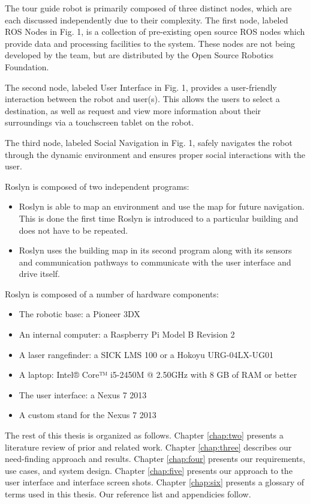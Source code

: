 \documentclass[11pt]{report}
\begin{document}
The tour guide robot is primarily composed of three distinct nodes, which are each discussed independently due to their complexity. The first node, labeled ROS Nodes in Fig. 1, is a collection of pre-existing open source ROS nodes which provide data and processing facilities to the system. These nodes are not being developed by the team, but are distributed by the Open Source Robotics Foundation.

The second node, labeled User Interface in Fig. 1, provides a user-friendly interaction between the robot and user(s). This allows the users to select a destination, as well as request and view more information about their surroundings via a touchscreen tablet on the robot.

The third node, labeled Social Navigation in Fig. 1, safely navigates the robot through the dynamic environment and ensures proper social interactions with the user.

Roslyn is composed of two independent programs:
\begin{itemize}
 \item Roslyn is able to map an environment and use the map for future navigation. This is done the first time Roslyn is introduced to a particular building and does not have to be repeated.
 \item Roslyn uses the building map in its second program along with its sensors and communication pathways to communicate with the user interface and drive itself.
\end{itemize}


Roslyn is composed of a number of hardware components:
\begin{itemize}
 \item The robotic base: a Pioneer 3DX
 \item An internal computer: a Raspberry Pi Model B Revision 2
 \item A laser rangefinder: a SICK LMS 100 or a Hokoyu URG-04LX-UG01
 \item A laptop: Intel® Core™ i5-2450M @ 2.50GHz with 8 GB of RAM or better
 \item The user interface: a Nexus 7 2013
 \item A custom stand for the Nexus 7 2013
\end{itemize}

The rest of this thesis is organized as follows. Chapter \ref{chap:two} presents a literature review of prior and related work. Chapter \ref{chap:three} describes our need-finding approach and results. Chapter \ref{chap:four} presents our requirements, use cases, and system design. Chapter \ref{chap:five} presents our approach to the user interface and interface screen shots. Chapter \ref{chap:six} presents a glossary of terms used in this thesis. Our reference list and appendicies follow.
\end{document}

